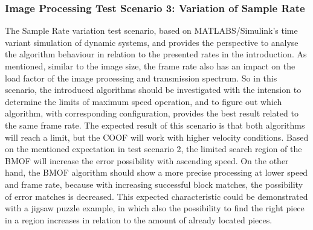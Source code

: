 \subsubsection{Image Processing Test Scenario 3: Variation of Sample Rate}
The Sample Rate variation test scenario, based on MATLABS/Simulink's time variant simulation of dynamic systems, and provides the perspective to analyse the algorithm behaviour in relation to the presented rates in the introduction. As mentioned, similar to the image size, the frame rate also has an impact on the load factor of the image processing and transmission spectrum. So in this scenario, the introduced algorithms should be investigated with the intension to determine the limits of maximum speed operation, and to figure out which algorithm, with corresponding configuration, provides the best result related to the same frame rate. The expected result of this scenario is that both algorithms will reach a limit, but the \gls{COOF} will work with higher velocity conditions. Based on the mentioned expectation in test scenario 2, the limited search region of the \gls{BMOF} will increase the error possibility with ascending speed. On the other hand, the \gls{BMOF} algorithm should show a more precise processing at lower speed and frame rate, because with increasing successful block matches, the possibility of error matches is decreased. This expected characteristic could be demonstrated with a jigsaw puzzle example, in which also the possibility to find the right piece in a region increases in relation to the amount of already located pieces.  

